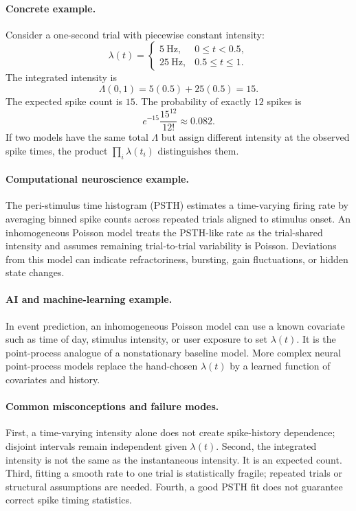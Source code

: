 \paragraph{Concrete example.}
Consider a one-second trial with piecewise constant intensity:
\[
\lambda(t)=
\begin{cases}
5\ \mathrm{Hz}, & 0\leq t<0.5,\\
25\ \mathrm{Hz}, & 0.5\leq t\leq1.
\end{cases}
\]
The integrated intensity is
\[
\Lambda(0,1)=5(0.5)+25(0.5)=15.
\]
The expected spike count is \(15\). The probability of exactly \(12\) spikes is
\[
e^{-15}\frac{15^{12}}{12!}\approx0.082.
\]
If two models have the same total \(\Lambda\) but assign different intensity at the observed spike times, the product \(\prod_i\lambda(t_i)\) distinguishes them.

\paragraph{Computational neuroscience example.}
The peri-stimulus time histogram (PSTH) estimates a time-varying firing rate by averaging binned spike counts across repeated trials aligned to stimulus onset. An inhomogeneous Poisson model treats the PSTH-like rate as the trial-shared intensity and assumes remaining trial-to-trial variability is Poisson. Deviations from this model can indicate refractoriness, bursting, gain fluctuations, or hidden state changes.

\paragraph{AI and machine-learning example.}
In event prediction, an inhomogeneous Poisson model can use a known covariate such as time of day, stimulus intensity, or user exposure to set \(\lambda(t)\). It is the point-process analogue of a nonstationary baseline model. More complex neural point-process models replace the hand-chosen \(\lambda(t)\) by a learned function of covariates and history.

\paragraph{Common misconceptions and failure modes.}
First, a time-varying intensity alone does not create spike-history dependence; disjoint intervals remain independent given \(\lambda(t)\). Second, the integrated intensity is not the same as the instantaneous intensity. It is an expected count. Third, fitting a smooth rate to one trial is statistically fragile; repeated trials or structural assumptions are needed. Fourth, a good PSTH fit does not guarantee correct spike timing statistics.

